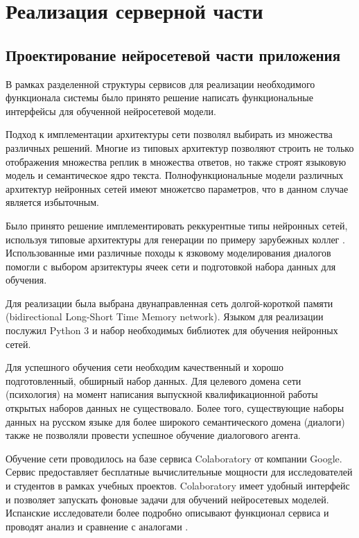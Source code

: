 \chapter{Реализация серверной части}
\section{Проектирование нейросетевой части приложения}
В рамках разделенной структуры сервисов для реализации необходимого функционала системы было принято решение написать функциональные интерфейсы для обученной нейросетевой модели. 

Подход к имплементации архитектуры сети позволял выбирать из множества различных решений. Многие из типовых архитектур позволяют строить не только отображения множества реплик в множества ответов, но также строят языковую модель и семантическое ядро текста. Полнофункциональные модели различных архитектур нейронных сетей имеют множетсво параметров, что в данном случае является избыточным. 

Было принято решение имплементировать реккурентные типы нейронных сетей, используя типовые архитектуры для генерации по примеру зарубежных коллег \cite{li2016deep, sharma2016natural,толкачев2019нейронное}. Использованные ими различные походы к язковому моделирования диалогов помогли с выбором арзитектуры ячеек сети и подготовкой набора данных для обучения. 

Для реализации была выбрана двунаправленная сеть долгой-короткой памяти (bidirectional Long-Short Time Memory network). Языком для реализации послужил Python 3 и набор необходимых библиотек для обучения нейронных сетей.

Для успешного обучения сети необходим качественный и хорошо подготовленный, обширный набор данных. Для целевого домена сети (психология) на момент написания выпускной квалификационной работы открытых наборов данных не существовало. Более того, существующие наборы данных на русском языке для более широкого семантического домена (диалоги) также не позволяли провести успешное обучение диалогового агента. 

Обучение сети проводилось на базе сервиса Colaboratory от компании Google. Сервис предоставляет бесплатные вычислительные мощности для исследователей и студентов в рамках учебных проектов. Colaboratory имеет удобный интерфейс и позволяет запускать фоновые задачи для обучений нейросетевых моделей. Испанские исследователи более подробно описывают функционал сервиса и проводят анализ и сравнение с аналогами \cite{carneiro2018performance}.

